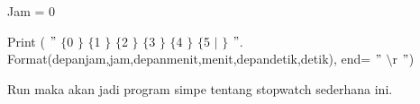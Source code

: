\noindent 
{\fontsize{14pt}{14pt}\selectfont Jam = 0 \\} \par
\noindent 
{\fontsize{14pt}{14pt}\selectfont Print ( $ " $ $  \{  $0 $  \}  $ $  \{  $1 $  \}  $ $  \{  $2 $  \}  $ $  \{  $3 $  \}  $ $  \{  $4 $  \}  $ $  \{  $5 $  \vert  $ $  \}  $ $ " $. Format(depanjam,jam,depanmenit,menit,depandetik,detik), end= $ " $ $  \setminus  $r $ " $) \\} \par
\vspace{14pt}
\noindent 
{\fontsize{14pt}{14pt}\selectfont Run maka akan jadi program simpe tentang stopwatch sederhana ini. \\} \par
